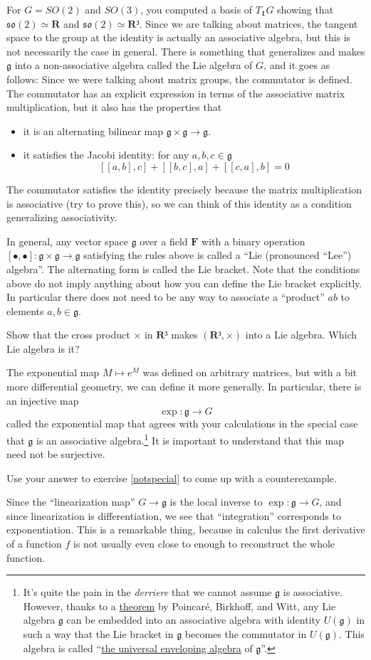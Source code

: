 For $G =SO(2)$ and $SO(3)$, you computed a basis of $T_𝟏G$ showing that $𝔰𝔬(2) ≃ 𝐑$ and $𝔰𝔬(2) ≃ 𝐑³$. Since we are talking about matrices, the tangent space to the group at the identity is actually an associative algebra, but this is not necessarily the case in general. There is something that generalizes and makes $𝔤$ into a non-associative algebra called the Lie algebra of $G$, and it goes as follows: 
Since we were talking about matrix groups, the commutator is defined. The commutator has an explicit expression in terms of the associative matrix multiplication, but it also has the properties that
\begin{itemize}
\item it is an alternating bilinear map $𝔤 × 𝔤 → 𝔤$. 
\item it satisfies the Jacobi identity: for any $a,b,c∈ 𝔤 $
$$
[[a,b],c] + [[b,c],a] + [[c,a],b] = 0
$$
\end{itemize}
The commutator satisfies the identity precisely because the matrix multiplication is associative (try to prove this), so we can think of this identity as a condition generalizing associativity. 

In general, any vector space $𝔤$ over a field $𝐅$ with a binary operation $[∙ , ∙ ] : 𝔤 × 𝔤 → 𝔤$ satisfying the rules above is called a “Lie (pronounced “Lee”) algebra”. The alternating form is called the Lie bracket. Note that the conditions above do not imply anything about how you can define the Lie bracket explicitly. In particular there does not need to be any way to associate a “product” $ab$ to elements $a,b∈ 𝔤$. 
\begin{exercise}
Show that the cross product $×$ in $𝐑³$ makes $(𝐑³, × )$ into a Lie algebra. Which Lie algebra is it?
\end{exercise}


The exponential map $M ↦ e^M$ was defined on arbitrary matrices, but with a bit more differential geometry, we can define it more generally. In particular, there is an injective map
$$
\exp : 𝔤 → G
$$
called the exponential map that agrees with your calculations in the special case that $𝔤$ is an associative algebra.\footnote{It's quite the pain in the {\it derriere} that we cannot assume $𝔤$ is associative. However, thanks to a \href{https://en.wikipedia.org/wiki/Poincaré–Birkhoff–Witt_theorem}{theorem} by Poincaré, Birkhoff, and Witt, any Lie algebra $𝔤$ can be embedded into an associative algebra with identity $U(𝔤)$ in such a way that the Lie bracket in $𝔤$ becomes the commutator in $U(𝔤)$. This algebra is called “\href{https://en.wikipedia.org/wiki/Universal_enveloping_algebra}{the universal enveloping algebra} of $𝔤$”.
}
It is important to understand that this map need not be surjective. 
\begin{exercise}
Use your answer to exercise \ref{notspecial} to come up with a counterexample.
\end{exercise}
Since the “linearization map” $G→ 𝔤$ is the local inverse to $\exp: 𝔤 → G$, and since linearization is differentiation, we see that “integration” corresponds to exponentiation. This is a remarkable thing, because in calculus the first derivative of a function $f$ is not usually even close to enough to reconstruct the whole function. 

